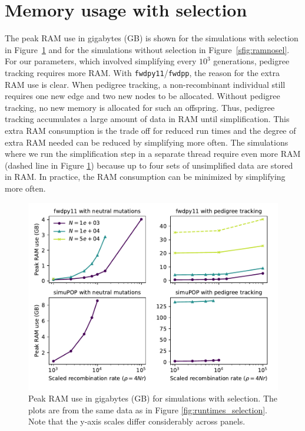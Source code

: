 \documentclass{article}
\newcommand{\fwdpp}{\texttt{fwdpp}}
\newcommand{\fwdpy}{\texttt{fwdpy11}}
\newcommand{\krt}[1]{{\em \color{green} #1}}
\begin{document}

\section{Memory usage with selection}
\label{ss:memuse}
\renewcommand{\thefigure}{B\arabic{figure}}
\setcounter{figure}{0}

The peak RAM use in gigabytes (GB) is shown for the simulations with selection in Figure~\ref{sfig:ramsel} and for the
simulations without selection in Figure~\ref{sfig:ramnosel}.  For our parameters, which involved simplifying every
$10^3$ generations,  pedigree tracking requires more RAM.  With \fwdpy{}/\fwdpp{}, the reason for the extra RAM use is clear.  When pedigree tracking, a non-recombinant
individual still requires one new edge and two new nodes to be allocated.  Without pedigree tracking, no new memory is
allocated for such an offspring.  Thus, pedigree tracking accumulates a large amount of data in RAM until
simplification.  This extra RAM consumption is the trade off for reduced run times and the degree of extra RAM needed
can be reduced by simplifying more often.  The simulations where we run the simplification step in a separate thread
require even more RAM (dashed line in Figure \ref{sfig:ramsel}) because up to four sets of unsimplified data are
stored in RAM.  In practice, the RAM consumption can be minimized by simplifying more often.


\begin{figure}
    \includegraphics[]{sims/memuse}
    \caption{\label{sfig:ramsel}Peak RAM use in gigabytes (GB) for simulations with selection.  The plots are from the
        same data as in Figure \ref{fig:runtimes_selection}. Note that the y-axis scales differ considerably across
    panels.}
\end{figure}
\end{document}
